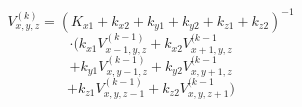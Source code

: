 \documentclass[12pt]{article}
\begin{document}
\begin{displaymath}
V_{x,y,z}^{(k)} = (K_{x1}+k_{x2}+k_{y1}+k_{y2}+k_{z1}+k_{z2})^{-1}
\end{displaymath}
\begin{displaymath}
\cdot (k_{x1}V_{x-1,y,z}^{(k-1)}+k_{x2}V_{x+1,y,z}^{(k-1}
\end{displaymath}
\begin{displaymath}
+k_{y1}V_{x,y-1,z}^{(k-1)}+k_{y2}V_{x,y+1,z}^{(k-1}
\end{displaymath}
\begin{displaymath}
+k_{z1}V_{x,y,z-1}^{(k-1)}+k_{z2}V_{x,y,z+1}^{(k-1})
\end{displaymath}
\end{document}
